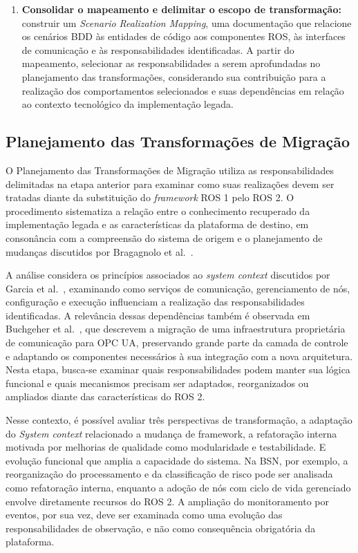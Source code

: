 \begin{enumerate}
    \item \textbf{Consolidar o mapeamento e
    delimitar o escopo de transformação:} construir um \textit{Scenario Realization Mapping}, uma documentação que relacione os cenários BDD às entidades de código aos componentes ROS, às interfaces de comunicação e às responsabilidades identificadas. A partir do mapeamento, selecionar as responsabilidades a serem aprofundadas no planejamento das transformações, considerando sua contribuição para a realização dos comportamentos selecionados e suas dependências em relação ao contexto tecnológico da implementação legada.

\end{enumerate}

\subsection{Planejamento das Transformações de Migração}
\label{sec:plan-migration-transformations}

O Planejamento das Transformações de Migração utiliza as responsabilidades delimitadas na etapa anterior para examinar como suas realizações devem ser tratadas diante da substituição do \textit{framework} ROS 1 pelo ROS 2. O procedimento sistematiza a relação entre o conhecimento recuperado da implementação legada e as características da plataforma de destino, em consonância com a compreensão do sistema de origem e o planejamento de mudanças discutidos por Bragagnolo et al.~\cite{BragagnoloMigration}.


A análise considera os princípios associados ao \textit{system context} discutidos por Garcia et al.~\cite{GarciaKMD12}, examinando como serviços de comunicação, gerenciamento de nós, configuração e execução influenciam a realização das responsabilidades identificadas. A relevância dessas dependências também é observada em Buchgeher et al.~\cite{BUCHGEHER2022276}, que descrevem a migração de uma infraestrutura proprietária de comunicação para OPC UA, preservando grande parte da camada de controle e adaptando os componentes necessários à sua integração com a nova arquitetura. Nesta etapa, busca-se examinar quais responsabilidades
podem manter sua lógica funcional e quais mecanismos precisam ser adaptados, reorganizados ou ampliados diante das características do ROS 2.

Nesse contexto, é possível avaliar três perspectivas de transformação, a adaptação do \textit{System context} relacionado a mudança de framework, a refatoração interna motivada por melhorias de qualidade como modularidade e testabilidade. E evolução funcional que amplia a capacidade do sistema. Na BSN, por exemplo, a reorganização do processamento e da classificação de risco pode ser analisada como refatoração interna, enquanto a adoção de nós com ciclo de vida gerenciado envolve diretamente recursos do ROS 2. A ampliação do monitoramento por eventos, por sua vez, deve ser examinada como uma evolução das responsabilidades de observação, e não como consequência obrigatória da plataforma.

